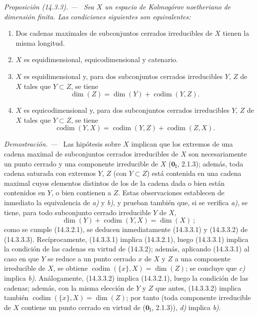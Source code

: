 \documentclass[10pt,oneside]{book}
\makeatletter
\newcommand{\setmanualcurrentlabel}[1]{\def\@currentlabel{#1}}
\newenvironment{proposition}[1][]{%
  \setmanualcurrentlabel{#1}\par\medskip\noindent\itshape Proposición (#1). ---\ }{\par}
\newenvironment{proof}{%
  \par\medskip\noindent\textit{Demostración. ---\ }}{\par}
\makeatother
\begin{document}
\begin{proposition}[14.3.3]
\label{0.14.3.3-es}
Sea $X$ un espacio de Kolmogórov noetheriano de dimensión finita. Las
condiciones siguientes son equivalentes:
\begin{enumerate}
  \item[\rm a)] Dos cadenas maximales de subconjuntos cerrados irreducibles de
  $X$ tienen la misma longitud.
  \item[\rm b)] $X$ es equidimensional, equicodimensional y catenario.
  \item[\textup{c)}] $X$ es equidimensional y, para dos subconjuntos cerrados
  irreducibles $Y$, $Z$ de $X$ tales que $Y\subset Z$, se tiene
  \[
    \dim(Z)=\dim(Y)+\operatorname{codim}(Y,Z).
    \tag{14.3.3.1}\label{0.14.3.3.1-es}
  \]
  \item[\textup{d)}] $X$ es equicodimensional y, para dos subconjuntos cerrados
  irreducibles $Y$, $Z$ de $X$ tales que $Y\subset Z$, se tiene
  \[
    \operatorname{codim}(Y,X)=
    \operatorname{codim}(Y,Z)+\operatorname{codim}(Z,X).
    \tag{14.3.3.2}\label{0.14.3.3.2-es}
  \]
\end{enumerate}
\end{proposition}

\begin{proof}
Las hipótesis sobre $X$ implican que los extremos de una cadena maximal de
subconjuntos cerrados irreducibles de $X$ son necesariamente un punto cerrado y
una componente irreducible de $X$ ($\mathbf 0_{\mathrm I}$, 2.1.3); además, toda
cadena saturada con extremos $Y$, $Z$ (con $Y\subset Z$) está contenida en una
cadena maximal cuyos elementos distintos de los de la cadena dada o bien están
contenidos en $Y$, o bien contienen a $Z$. Estas observaciones establecen de
inmediato la equivalencia de \emph{a)} y \emph{b)}, y prueban también que, si se verifica \emph{a)},
se tiene, para todo subconjunto cerrado irreducible $Y$ de $X$,
\[
  \dim(Y)+\operatorname{codim}(Y,X)=\dim(X)~;
  \tag{14.3.3.3}\label{0.14.3.3.3-es}
\]
como se cumple (14.3.2.1), se deducen inmediatamente (14.3.3.1) y (14.3.3.2)
de (14.3.3.3). Recíprocamente, (14.3.3.1) implica (14.3.2.1), luego
(14.3.3.1) implica la condición de las cadenas en virtud de (14.3.2); además,
aplicando (14.3.3.1) al caso en que $Y$ se reduce a un punto cerrado $x$ de $X$
y $Z$ a una componente irreducible de $X$, se obtiene
$\operatorname{codim}(\{x\},X)=\dim(Z)$; se concluye que \emph{c)} implica \emph{b)}.
Análogamente, (14.3.3.2) implica (14.3.2.1), luego la condición de las cadenas;
además, con la misma elección de $Y$ y $Z$ que antes, (14.3.3.2) implica
también $\operatorname{codim}(\{x\},X)=\dim(Z)$; por tanto (toda componente
irreducible de $X$ contiene un punto cerrado en virtud de ($\mathbf 0_{\mathrm I}$,
2.1.3)), \emph{d)} implica \emph{b)}.
\end{proof}
\end{document}

